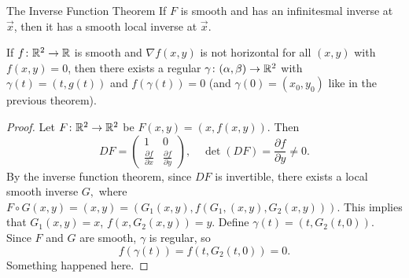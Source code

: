 \begin{namedthm}{The Inverse Function Theorem}
   If $F$ is smooth and has an infinitesmal inverse at $\vec x$, then it has a smooth local inverse at $\vec x$. 
\end{namedthm}
\begin{theorem}
    If $f \colon \mathbb{R}^2 \to \mathbb{R}$ is smooth and $\nabla f(x,y)$ is not horizontal for all $(x,y)$ with $f(x,y)=0$, then there exists a regular $\gamma \colon (\alpha ,\beta ) \to \mathbb{R}^2$ with $\gamma (t)=(t, g(t))$ and $f(\gamma (t))=0$ (and $\gamma (0)=(x_0,y_0)$ like in the previous theorem).
\end{theorem}
\begin{proof}
    Let $F \colon \mathbb{R}^2 \to \mathbb{R}^2$ be $F(x,y)=(x,f(x,y)) .$ Then \[
    DF = 
    \begin{pmatrix}
        1 & 0 \\ \frac{\partial f}{\partial x} & \frac{\partial f}{\partial y}
    \end{pmatrix}, \quad \det (DF)= \frac{\partial f}{\partial y}\neq 0.
\] By the inverse function theorem, since $DF$ is invertible, there exists a local smooth inverse $G,$ where $F \circ G(x,y)=(x,y)=(G_1(x,y), f\left( G_1,(x,y),G_2(x,y) \right) )$. This implies that $G_1(x,y)=x$, $f(x,G_2(x,y))=y$. Define $\gamma (t)= (t, G_2(t,0))$. Since $F$ and $G$ are smooth, $\gamma $ is regular, so \[
f(\gamma (t))=f(t,G_2(t,0))=0.
\] Something happened here.
\end{proof}

